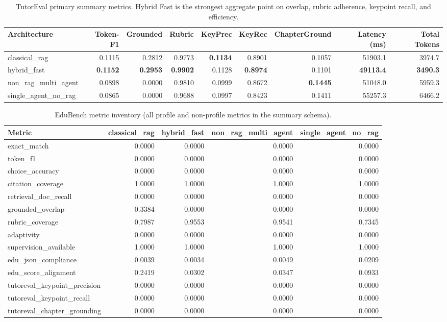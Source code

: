 \begin{table}[t]
\caption{TutorEval primary summary metrics. Hybrid Fast is the strongest aggregate point on overlap, rubric adherence, keypoint recall, and efficiency.}
\label{tab:tutoreval_summary}
\centering
\footnotesize
\begin{tabular}{lrrrrrrrr}
\toprule
Architecture & Token-F1 & Grounded & Rubric & KeyPrec & KeyRec & ChapterGround & Latency (ms) & Total Tokens \\
\midrule
classical\_rag & 0.1115 & 0.2812 & 0.9773 & \textbf{0.1134} & 0.8901 & 0.1057 & 51903.1 & 3974.7 \\
hybrid\_fast & \textbf{0.1152} & \textbf{0.2953} & \textbf{0.9902} & 0.1128 & \textbf{0.8974} & 0.1101 & \textbf{49113.4} & \textbf{3490.3} \\
non\_rag\_multi\_agent & 0.0898 & 0.0000 & 0.9810 & 0.0999 & 0.8672 & \textbf{0.1445} & 51048.0 & 5959.3 \\
single\_agent\_no\_rag & 0.0865 & 0.0000 & 0.9688 & 0.0997 & 0.8423 & 0.1411 & 55257.3 & 6466.2 \\
\bottomrule
\end{tabular}
\end{table}

\begin{table}[t]
\caption{EduBench metric inventory (all profile and non-profile metrics in the summary schema).}
\label{tab:edubench_metric_inventory}
\centering
\footnotesize
\begin{tabular}{lrrrr}
\toprule
Metric & classical\_rag & hybrid\_fast & non\_rag\_multi\_agent & single\_agent\_no\_rag \\
\midrule
exact\_match & 0.0000 & 0.0000 & 0.0000 & 0.0000 \\
token\_f1 & 0.0000 & 0.0000 & 0.0000 & 0.0000 \\
choice\_accuracy & 0.0000 & 0.0000 & 0.0000 & 0.0000 \\
citation\_coverage & 1.0000 & 1.0000 & 1.0000 & 1.0000 \\
retrieval\_doc\_recall & 0.0000 & 0.0000 & 0.0000 & 0.0000 \\
grounded\_overlap & 0.3384 & 0.0000 & 0.0000 & 0.0000 \\
rubric\_coverage & 0.7987 & 0.9553 & 0.9541 & 0.7345 \\
adaptivity & 0.0000 & 0.0000 & 0.0000 & 0.0000 \\
supervision\_available & 1.0000 & 1.0000 & 1.0000 & 1.0000 \\
edu\_json\_compliance & 0.0039 & 0.0034 & 0.0049 & 0.0209 \\
edu\_score\_alignment & 0.2419 & 0.0302 & 0.0347 & 0.0933 \\
tutoreval\_keypoint\_precision & 0.0000 & 0.0000 & 0.0000 & 0.0000 \\
tutoreval\_keypoint\_recall & 0.0000 & 0.0000 & 0.0000 & 0.0000 \\
tutoreval\_chapter\_grounding & 0.0000 & 0.0000 & 0.0000 & 0.0000 \\
\bottomrule
\end{tabular}
\end{table}

